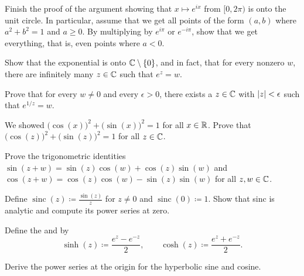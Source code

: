 \begin{exercise}
Finish the proof of the argument showing that $x \mapsto e^{ix}$ from
$[0,2\pi)$ is onto the unit circle.  In particular, assume that
we get all points of the form $(a,b)$ where $a^2+b^2=1$ and $a \geq 0$.
By multiplying by $e^{i\pi}$ or $e^{-i\pi}$, show that we get everything,
that is, even points where $a < 0$.
\end{exercise}

\begin{exercise}
Show that the exponential is onto ${\mathbb{C}} \setminus \{ 0 \}$, and in fact,
that for every nonzero $w$, there are infinitely many $z \in {\mathbb{C}}$ such that $e^z=w$.
\end{exercise}

\begin{exercise}
Prove that for every $w \neq 0$ and every $\epsilon > 0$,
there exists a $z \in {\mathbb{C}}$ with $\lvert {z} \rvert < \epsilon$ such that $e^{1/z} = w$.
\end{exercise}

\begin{exercise}\label{exercise:cossinidentity}
We showed
${\bigl( \cos(x) \bigr)}^2 + {\bigl( \sin(x) \bigr)}^2 = 1$
for all $x \in {\mathbb{R}}$.
Prove that
${\bigl( \cos(z) \bigr)}^2 + {\bigl( \sin(z) \bigr)}^2 = 1$
for all $z \in {\mathbb{C}}$.
\end{exercise}

\begin{exercise}
Prove the trigonometric identities
$\sin(z + w) = \sin(z) \cos(w) + \cos(z) \sin(w)$ and
$\cos(z + w) = \cos(z) \cos(w) - \sin(z) \sin(w)$ for all $z,w \in {\mathbb{C}}$.
\end{exercise}

\begin{exercise}
Define $\operatorname{sinc}(z) \coloneqq \frac{\sin(z)}{z}$ for $z \neq 0$ and
$\operatorname{sinc}(0) \coloneqq 1$.
Show that sinc is analytic and compute its power series at zero.
\end{exercise}

\begin{exnote}
\pagebreak[2]
Define the \emph{} and
\emph{} by
\begin{equation*}
\sinh(z) \coloneqq \frac{e^z-e^{-z}}{2}, \qquad
\cosh(z) \coloneqq \frac{e^z+e^{-z}}{2}.
\end{equation*}
\end{exnote}

\begin{exercise}
Derive the power series at the origin for the hyperbolic sine and cosine.
\end{exercise}

